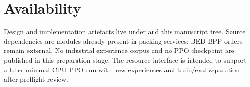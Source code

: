 \section{Availability}

Design and implementation artefacts live under
 and this manuscript tree. Source
dependencies are modules already present in packing-services; BED-BPP orders
remain external. No industrial experience corpus and no PPO checkpoint are
published in this preparation stage. The resource interface is intended to
support a later minimal CPU PPO run with new experiences and train/eval
separation after preflight review.
